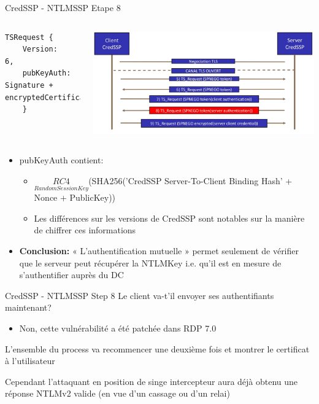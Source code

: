\documentclass{beamer}
\begin{document}
\begin{frame}[fragile]{CredSSP - NTLMSSP Etape 8 }
	 \begin{columns}[T]
	 	 \begin{lstlisting}[frame=single,basicstyle=\tiny]
TSRequest {
	Version:     6,
	pubKeyAuth: Signature + encryptedCertificate,
	}
	\end{lstlisting}
	 \includegraphics[scale=0.07]{step8.jpg}
	 \end{columns}
	 	 	\begin{itemize}
	 	\item pubKeyAuth contient:
	 		\begin{itemize}
	 		\item $\underset{RandomSessionKey}{RC4}$(SHA256('CredSSP Server-To-Client Binding Hash' + Nonce + PublicKey))
	 		\item Les différences sur les versions de CredSSP sont notables sur la manière de chiffrer ces informations \newline
	 		
			\end{itemize}
			\item \textbf{Conclusion: } « L'authentification mutuelle » permet seulement de vérifier que le serveur peut récupérer la NTLMKey i.e. qu'il est en mesure de s'authentifier auprès du DC
	 	\end{itemize}
\end{frame}

\begin{frame}[fragile]{CredSSP - NTLMSSP Step 8 }
Le client va-t'il envoyer ses authentifiants maintenant? 
\begin{itemize}
\item Non, cette vulnérabilité a été patchée dans RDP 7.0\newline

\end{itemize}
L'ensemble du process va recommencer une deuxième fois et montrer le certificat à l'utilisateur\newline

Cependant l'attaquant en position de singe intercepteur aura déjà obtenu une réponse NTLMv2 valide (en vue d'un cassage ou d'un relai) 
\end{frame}
\end{document}
